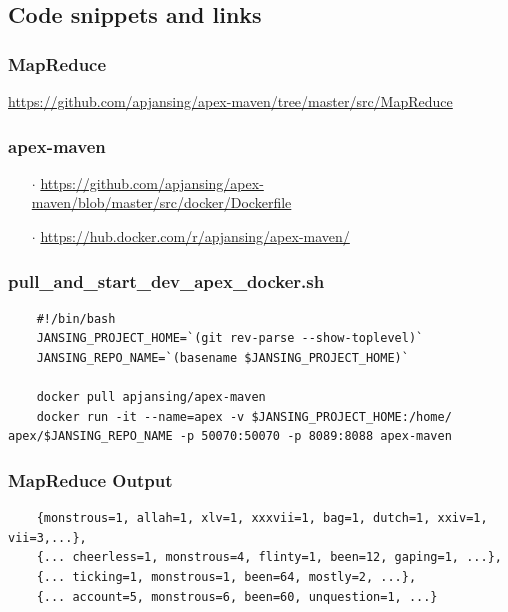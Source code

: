 \documentclass[final]{IEEEtran}
\begin{document}
\subsection{Code snippets and links}
  \subsubsection{MapReduce}\label{sec:map-reduce}
  \url{https://github.com/apjansing/apex-maven/tree/master/src/MapReduce}

  \subsubsection{apex-maven}\label{sec:apex-maven}
  \begin{enumerate}
    \item[$\cdot$] \url{https://github.com/apjansing/apex-maven/blob/master/src/docker/Dockerfile}
    \item[$\cdot$] \url{https://hub.docker.com/r/apjansing/apex-maven/}
  \end{enumerate}
  
  \subsubsection{pull\_and\_start\_dev\_apex\_docker.sh}\label{sec:start-script}
  \begin{lstlisting}
    #!/bin/bash
    JANSING_PROJECT_HOME=`(git rev-parse --show-toplevel)`
    JANSING_REPO_NAME=`(basename $JANSING_PROJECT_HOME)`
    
    docker pull apjansing/apex-maven
    docker run -it --name=apex -v $JANSING_PROJECT_HOME:/home/ apex/$JANSING_REPO_NAME -p 50070:50070 -p 8089:8088 apex-maven
  \end{lstlisting}
  
\subsubsection{MapReduce Output}\label{sec:map-reduce-output}
  \begin{lstlisting}
    {monstrous=1, allah=1, xlv=1, xxxvii=1, bag=1, dutch=1, xxiv=1, vii=3,...},
    {... cheerless=1, monstrous=4, flinty=1, been=12, gaping=1, ...},
    {... ticking=1, monstrous=1, been=64, mostly=2, ...},
    {... account=5, monstrous=6, been=60, unquestion=1, ...}
  \end{lstlisting}


\end{document}
